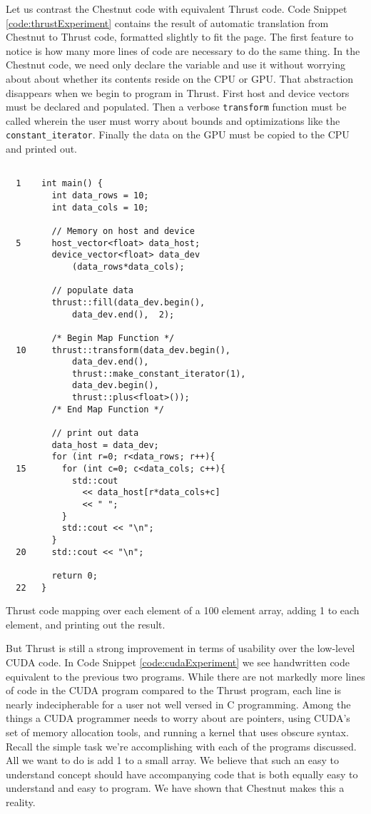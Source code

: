 \documentclass[twocolumn]{article}
\renewcommand{\|}{\origbar} %
\newcommand{\code}[1]{\texttt{#1}}
\begin{document}
Let us contrast the Chestnut code with equivalent Thrust code. Code Snippet \ref{code:thrustExperiment} contains the result of automatic translation from Chestnut to Thrust code, formatted slightly to fit the page. The first feature to notice is how many more lines of code are necessary to do the same thing. In the Chestnut code, we need only declare the variable and use it without worrying about about whether its contents reside on the CPU or GPU. That abstraction disappears when we begin to program in Thrust. First host and device vectors must be declared and populated. Then a verbose \code{transform} function must be called wherein the user must worry about bounds and optimizations like the \code{constant\_iterator}. Finally the data on the GPU must be copied to the CPU and printed out. 

\begin{Code Snippet}
\begin{verbatim}

  1    int main() {
         int data_rows = 10;
         int data_cols = 10;

         // Memory on host and device
  5      host_vector<float> data_host; 
         device_vector<float> data_dev
             (data_rows*data_cols); 

         // populate data
         thrust::fill(data_dev.begin(),
             data_dev.end(),  2);

         /* Begin Map Function */
  10     thrust::transform(data_dev.begin(), 
             data_dev.end(), 
             thrust::make_constant_iterator(1), 
             data_dev.begin(), 
             thrust::plus<float>()); 
         /* End Map Function */

         // print out data
         data_host = data_dev;
         for (int r=0; r<data_rows; r++){
  15       for (int c=0; c<data_cols; c++){
             std::cout
               << data_host[r*data_cols+c]
               << " ";
           }
           std::cout << "\n";
         }
  20     std::cout << "\n";

         return 0;
  22   }
\end{verbatim}
\caption{Thrust code mapping over each element of a 100 element array, adding 1 to each element, and printing out the result.}
\label{code:thrustExperiment}
\end{Code Snippet}

But Thrust is still a strong improvement in terms of usability over the low-level CUDA code. In Code Snippet \ref{code:cudaExperiment} we see handwritten code equivalent to the previous two programs. While there are not markedly more lines of code in the CUDA program compared to the Thrust program, each line is nearly indecipherable for a user not well versed in C programming. Among the things a CUDA programmer needs to worry about are pointers, using CUDA's set of memory allocation tools, and running a kernel that uses obscure syntax. Recall the simple task we're accomplishing with each of the programs discussed. All we want to do is add 1 to a small array. We believe that such an easy to understand concept should have accompanying code that is both equally easy to understand and easy to program. We have shown that Chestnut makes this a reality.
\end{document}
